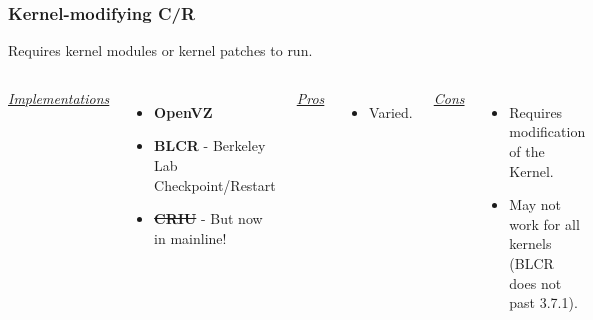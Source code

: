 \documentclass[compress]{beamer}
\begin{document}
\begin{frame}
\frametitle{Kernel-modifying C/R}

Requires kernel modules or kernel patches to run.

\begin{columns}[t]
\ul{\textit{Implementations}}
\begin{itemize}
\item \textbf{OpenVZ}
\item \textbf{BLCR} - Berkeley Lab Checkpoint/Restart 
\item \textbf{\st{CRIU}} - But now in mainline!
\end{itemize}

\ul{\textit{Pros}}
\begin{itemize}
\item Varied.
\end{itemize}

\ul{\textit{Cons}}
\begin{itemize}
\item Requires modification of the Kernel.
\item May not work for all kernels (BLCR does not past 3.7.1).
\end{itemize}

\end{columns}

\end{frame}
  
\end{document}
